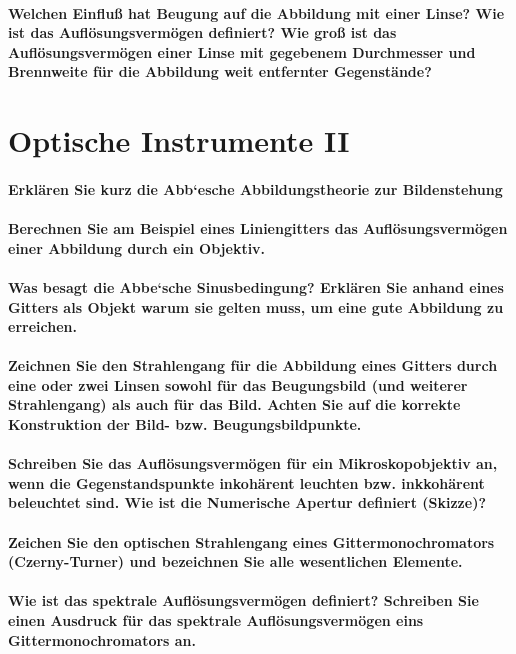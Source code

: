 \documentclass[a4paper, 11pt, parskip=half]{scrartcl}
\begin{document}
\paragraph{Welchen Einfluß hat Beugung auf die Abbildung mit einer Linse? Wie ist das
Auflösungsvermögen definiert? Wie groß ist das Auflösungsvermögen einer Linse mit gegebenem
Durchmesser und Brennweite für die Abbildung weit entfernter Gegenstände?}

\newpage

\section{Optische Instrumente II}

\paragraph{Erklären Sie kurz die Abb‘esche Abbildungstheorie zur Bildenstehung}

\paragraph{Berechnen Sie am Beispiel eines Liniengitters das Auflösungsvermögen einer Abbildung
durch ein Objektiv.}

\paragraph{Was besagt die Abbe‘sche Sinusbedingung? Erklären Sie anhand eines Gitters als Objekt
warum sie gelten muss, um eine gute Abbildung zu erreichen.}

\paragraph{Zeichnen Sie den Strahlengang für die Abbildung eines Gitters durch eine oder zwei Linsen
sowohl für das Beugungsbild (und weiterer Strahlengang) als auch für das Bild. Achten Sie
auf die korrekte Konstruktion der Bild- bzw. Beugungsbildpunkte.}

\paragraph{Schreiben Sie das Auflösungsvermögen für ein Mikroskopobjektiv an, wenn die
Gegenstandspunkte inkohärent leuchten bzw. inkkohärent beleuchtet sind. Wie ist die Numerische
Apertur definiert (Skizze)?}

\paragraph{Zeichen Sie den optischen Strahlengang eines Gittermonochromators (Czerny-Turner) und
bezeichnen Sie alle wesentlichen Elemente.}

\paragraph{Wie ist das spektrale Auflösungsvermögen definiert? Schreiben Sie einen Ausdruck für das
spektrale Auflösungsvermögen eins Gittermonochromators an.}
\end{document}

